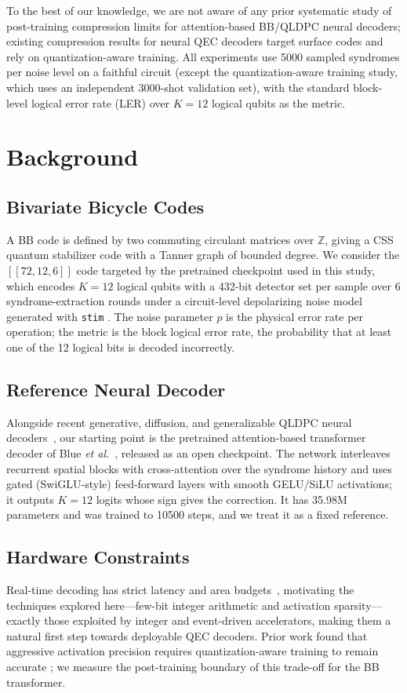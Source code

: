 ﻿\documentclass[conference]{IEEEtran}
\begin{document}
To the best of our knowledge, we are not aware of any prior systematic study of post-training compression limits for attention-based BB/QLDPC neural decoders;
existing compression results for neural QEC decoders target surface codes
and rely on quantization-aware training. All experiments use 5000 sampled
syndromes per noise level on a faithful circuit (except the
quantization-aware training study, which uses an independent 3000-shot
validation set), with the standard
block-level logical error rate (LER) over $K{=}12$ logical qubits as the
metric.
\section{Background}\label{sec:bg}
\subsection{Bivariate Bicycle Codes}
A BB code is defined by two commuting circulant matrices over
$\mathbb{Z}$, giving a CSS quantum stabilizer code with a Tanner graph of
bounded degree. We consider the $[[72,12,6]]$ code targeted by the
pretrained checkpoint used in this study, which encodes $K{=}12$ logical
qubits with a 432-bit detector set per sample over 6 syndrome-extraction
rounds under a circuit-level depolarizing noise model generated with
\texttt{stim} \cite{stimb}. The noise parameter $p$ is the physical error
rate per operation; the metric is the block logical error rate, the
probability that at least one of the 12 logical bits is decoded
incorrectly.
\subsection{Reference Neural Decoder}
Alongside recent generative, diffusion, and generalizable QLDPC neural
decoders~\cite{LiuDiff25,CaoGen25,MiMueller25}, our starting point is the
pretrained attention-based transformer decoder of Blue \emph{et al.}~\cite{blue2026},
released as an open checkpoint. The network interleaves recurrent spatial
blocks with cross-attention over the syndrome history and uses gated
(SwiGLU-style) feed-forward layers with smooth GELU/SiLU activations; it
outputs $K{=}12$ logits whose sign gives the correction. It has 35.98M
parameters and was trained to 10500 steps, and we treat it as a fixed
reference.
\subsection{Hardware Constraints}
Real-time decoding has strict latency and area budgets~\cite{DasHPCA22},
motivating the techniques explored here---few-bit integer arithmetic and
activation sparsity---exactly those exploited by integer and event-driven
accelerators, making them a natural first step towards deployable QEC
decoders. Prior work found that aggressive activation precision requires
quantization-aware training to remain accurate \cite{rethink2026}; we
measure the post-training boundary of this trade-off for the BB
transformer.
\end{document}
